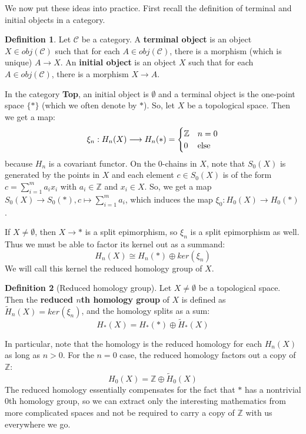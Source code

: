 \documentclass[11pt, oneside]{amsart}   	%
\theoremstyle{definition}
\newtheorem{definition}{Definition}[section]
\begin{document}
We now put these ideas into practice. First recall the definition of terminal and initial objects in a category.
\begin{definition}
	Let $\mathcal C$ be a category. A \textbf{terminal object} is an object $X\in obj(\mathcal C)$ such that for each $A\in 
	obj(\mathcal C)$, there is a morphism (which is unique) $A\rightarrow X$. An \textbf{initial object} is an object $X$ 
	such that for each $A\in obj(\mathcal C)$, there is a morphism $X\rightarrow A$. 
\end{definition}

In the category \textbf{Top}, an initial object is $\emptyset$ and a terminal object is the one-point space $\{*\}$ (which we 
often denote by $*$). So, let $X$ be a topological space. Then we get a map:
\begin{equation}
	\xi_n : H_n(X)\longrightarrow H_n(*) = \begin{cases} \mathbb Z & n = 0 \\ 0 & \textnormal{else} \end{cases}
\end{equation}
because $H_n$ is a covariant functor. On the $0$-chains in $X$, note that $S_0(X)$ is generated by the points in $X$ and 
each element $c\in S_0(X)$ is of the form $c = \sum_{i = 1}^m a_i x_i$ with $a_i\in\mathbb Z$ and $x_i\in X$. So, we get 
a map $S_0(X)\rightarrow S_0(*), c\mapsto\sum_{i = 1}^m a_i$, which induces the map $\xi_0 : H_0(X)\rightarrow H_0(*)$. 

If $X\neq\emptyset$, then $X\rightarrow *$ is a split epimorphism, so $\xi_n$ is a split epimorphism as well. Thus we must 
be able to factor its kernel out as a summand:
\begin{equation}
	H_n(X)\cong H_n(*)\oplus ker(\xi_n)
\end{equation}
We will call this kernel the reduced homology group of $X$.
\begin{definition}[Reduced homology group]
	Let $X\neq\emptyset$ be a topological space. Then the \textbf{reduced $n$th homology group} of $X$ is defined as 
	$\tilde H_n(X) = ker(\xi_n)$, and the homology splits as a sum:
	\begin{equation}
		H_*(X) = H_*(*)\oplus \tilde H_*(X)
	\end{equation}
\end{definition}
In particular, note that the homology is the reduced homology for each $H_n(X)$ as long as $n > 0$. For the $n = 0$ case, 
the reduced homology factors out a copy of $\mathbb Z$:
\begin{equation}
	H_0(X) = \mathbb Z\oplus\tilde H_0(X)
\end{equation}
The reduced homology essentially compensates for the fact that $*$ has a nontrivial 0th homology group, so we can 
extract only the interesting mathematics from more complicated spaces and not be required to carry a copy of $\mathbb Z$ 
with us everywhere we go. 
\end{document}
